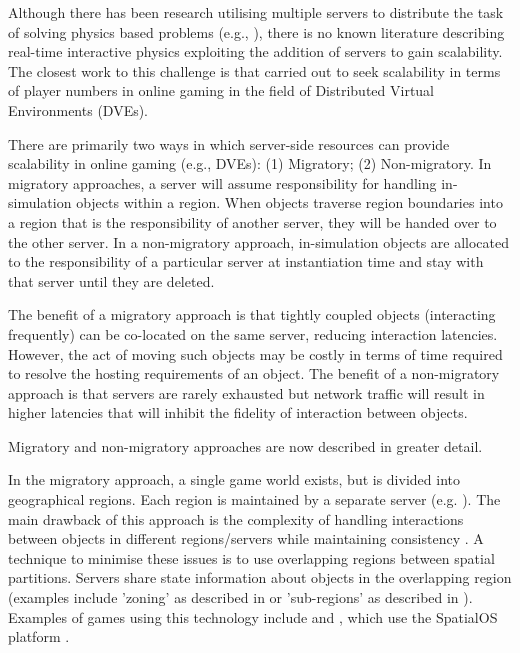 Although there has been research utilising multiple servers to distribute the task of solving physics based problems (e.g., \cite{mashayekhi2018automatically}), there is no known literature describing real-time interactive physics exploiting the addition of servers to gain scalability. The closest work to this challenge is that carried out to seek scalability in terms of player numbers in online gaming in the field of Distributed Virtual Environments (DVEs). 

There are primarily two ways in which server-side resources can provide scalability in online gaming (e.g., DVEs): (1) Migratory; (2) Non-migratory. In migratory approaches, a server will assume responsibility for handling in-simulation objects within a region. When objects traverse region boundaries into a region that is the responsibility of another server, they will be handed over to the other server. In a non-migratory approach, in-simulation objects are allocated to the responsibility of a particular server at instantiation time and stay with that server until they are deleted.

The benefit of a migratory approach is that tightly coupled objects (interacting frequently) can be co-located on the same server, reducing interaction latencies. However, the act of moving such objects may be costly in terms of time required to resolve the hosting requirements of an object. The benefit of a non-migratory approach is that servers are rarely exhausted but network traffic will result in higher latencies that will inhibit the fidelity of interaction between objects.

Migratory and non-migratory approaches are now described in greater detail.

In the migratory approach, a single game world exists, but is divided into geographical regions. Each region is maintained by a separate server (e.g. \cite{AnOverlappingArchitecture, ScalabilityIssues, LoadBalancingForDistributedVR, ALoadBalancingAlgorithm, SpatialOS}). The main drawback of this approach is the complexity of handling interactions between objects in different regions/servers while maintaining consistency \cite{P2PForMMOs}. A technique to minimise these issues is to use overlapping regions between spatial partitions. Servers share state information about objects in the overlapping region (examples include 'zoning' as described in \cite{AnOverlappingArchitecture} or 'sub-regions' as described in \cite{ScalabilityIssues}). Examples of games using this technology include \cite{Vanishin30:online} and \cite{WorldsAd48:online}, which use the SpatialOS platform \cite{SpatialOS}. %
 
